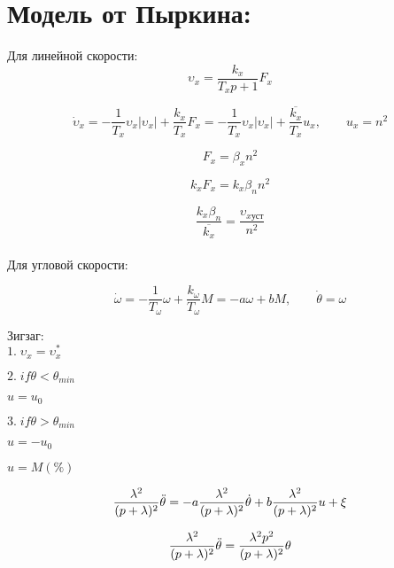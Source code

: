 \newpage

\section*{Модель от Пыркина:} 
Для линейной скорости:
\begin{equation*}
\upsilon_x = \frac{k_x}{T_xp + 1}F_x
\end{equation*} 

\begin{equation*}
\Dot{\upsilon}_x = -\frac{1}{T_x}\upsilon_x|\upsilon_x| + \frac{k_x}{T_x}F_x = -\frac{1}{T_x}\upsilon_x|\upsilon_x| + \frac{\overline{k_x}}{T_x}u_x, \qquad u_x = n^2
\end{equation*}

\begin{equation*}
F_x = \beta_xn^2
\end{equation*} 

\begin{equation*}
k_xF_x = k_x\beta_nn^2
\end{equation*} 

\begin{equation*}
\frac{k_x\beta_n}{\overline{k_x}} = \frac{\upsilon_{x \text{уст}}}{n^2}
\end{equation*} \\

Для угловой скорости:

\begin{equation*}
\Dot{\omega} = -\frac{1}{T_\omega}\omega + \frac{k_\omega}{T_\omega}M = -a\omega + bM, \qquad \Dot{\theta} = \omega
\end{equation*}

Зигзаг: \\

$1. \; \upsilon_x = \upsilon_x^* $

$2. \; if \theta < \theta_{min} $

$u = u_0 $

$3. \; if \theta > \theta_{min} $

$u = -u_0$

$u = M(\%)$


\begin{equation*}
\frac{\lambda^2}{(p+\lambda)^2}\Ddot{\theta} = -a\frac{\lambda^2}{(p+\lambda)^2}\Dot{\theta} + b\frac{\lambda^2}{(p+\lambda)^2}u + \xi
\end{equation*}

\begin{equation*}
\frac{\lambda^2}{(p+\lambda)^2}\Ddot{\theta} = \frac{\lambda^2p^2}{(p+\lambda)^2}\theta
\end{equation*}

